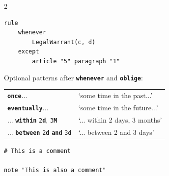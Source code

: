 \documentclass[a4paper,9pt]{extarticle}
\newcommand{\kw}[1]{{\color{magenta}\texttt{\bfseries\upshape #1}}}
\newcommand{\bluekw}[1]{{\color{blue}\texttt{\bfseries\upshape #1}}}
\begin{document}
\begin{multicols}{2}
\begin{tcolorbox}[title={\bfseries 6 \quad Rules}, colframe=blue!75!black, left=1pt, right=1pt, top=0pt, bottom=0pt]
\begin{tcolorbox}[title=6.3 Exception rules, left=1pt, right=1pt]
\begin{lstlisting}
rule
    whenever
        LegalWarrant(c, d)
    except
        article "5" paragraph "1"
\end{lstlisting}
        \vspace{-1em}
      \end{tcolorbox}
      
      \begin{tcolorbox}[title=6.4 Patterns, left=1pt, right=1pt]
        Optional patterns after \kw{whenever} and \kw{oblige}:
        
        \begin{tabular}{ll}
          \kw{once}... & `some time in the past...' \\
          \kw{eventually}... & `some time in the future...'\\
          ... \kw{within} \texttt{2}\bluekw{d}, \texttt{3}\bluekw{M}  & `... within 2 days, 3 months' \\
          ... \kw{between} \texttt{2}\bluekw{d} \kw{and} \texttt{3}\bluekw{d}  & `... between 2 and 3 days'
        \end{tabular}
      \end{tcolorbox}
    \end{tcolorbox}

    \begin{tcolorbox}[title={\bfseries 7 \quad Comments}, colframe=blue!75!black, left=1pt, right=1pt, top=0pt, bottom=0pt]
\begin{lstlisting}
# This is a comment

note "This is also a comment"
\end{lstlisting}
    \end{tcolorbox}
    \end{multicols}
\end{document}
